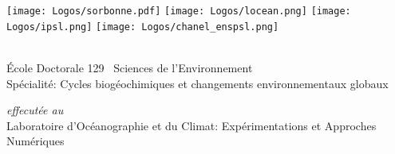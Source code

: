 

\NewDocumentCommand {}

\begin{titlingpage}

\begin{center}
  \def\logosheight{3.2em}
  \texttt{[image: Logos/sorbonne.pdf]}
  \hfill
  \texttt{[image: Logos/locean.png]}
  \hfill
  \texttt{[image: Logos/ipsl.png]}
  \hfill
  \texttt{[image: Logos/chanel\_enspsl.png]}

  \vspace{3.5ex}

  \\
  \vspace{3ex}
  {\normalsize École Doctorale 129 \textendash\ Sciences de l'Environnement\\
  Spécialité: Cycles biogéochimiques et changements environnementaux globaux}

  \vspace{2ex}

  {\small\textit{effecutée au}}\\
  {\normalsize Laboratoire d'Océanographie et du Climat: Expérimentations et Approches Numériques}


  \parbox{0.9\linewidth}{
    {
      \centering\parskip=0pt
      \xhrulefill[thickness=2pt, height=-0.6ex]\par
      \anysize{19pt}{\linespread{1.5}\bfseries\Title\\
      \strut\xhrulefill[thickness=2pt, height=0.5ex]}
    }
  }



\end{center}


\end{titlingpage}
